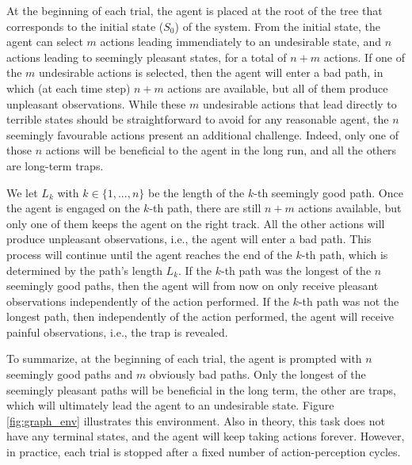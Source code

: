 \documentclass[twoside,11pt]{article}
\begin{document}
At the beginning of each trial, the agent is placed at the root of the tree that corresponds to the initial state ($S_0$) of the system. From the initial state, the agent can select $m$ actions leading immendiately to an undesirable state, and $n$ actions leading to seemingly pleasant states, for a total of $n + m$ actions. If one of the $m$ undesirable actions is selected, then the agent will enter a bad path, in which (at each time step) $n + m$ actions are available, but all of them produce unpleasant observations. While these $m$ undesirable actions that lead directly to terrible states should be straightforward to avoid for any reasonable agent, the $n$ seemingly favourable actions present an additional challenge. Indeed, only one of those $n$ actions will be beneficial to the agent in the long run, and all the others are long-term traps.

We let $L_k$ with $k \in \{1, ..., n\}$ be the length of the $k$-th seemingly good path. Once the agent is engaged on the $k$-th path, there are still $n + m$ actions available, but only one of them keeps the agent on the right track. All the other actions will produce unpleasant observations, i.e., the agent will enter a bad path. This process will continue until the agent reaches the end of the $k$-th path, which is determined by the path's length $L_k$. If the $k$-th path was the longest of the $n$ seemingly good paths, then the agent will from now on only receive pleasant observations independently of the action performed. If the $k$-th path was not the longest path, then independently of the action performed, the agent will receive painful observations, i.e., the trap is revealed.

To summarize, at the beginning of each trial, the agent is prompted with $n$ seemingly good paths and $m$ obviously bad paths. Only the longest of the seemingly pleasant paths will be beneficial in the long term, the other are traps, which will ultimately lead the agent to an undesirable state. Figure \ref{fig:graph_env} illustrates this environment. Also in theory, this task does not have any terminal states, and the agent will keep taking actions forever. However, in practice, each trial is stopped after a fixed number of action-perception cycles.
\end{document}
